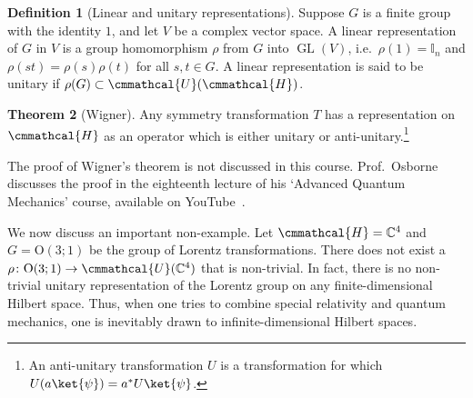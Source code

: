 \documentclass[a4 paper, 12pt]{book}
\renewcommand{\mathcal}{\cmmathcal}
\theoremstyle{definition}
\newtheorem{theorem}{Theorem}[section]
\newtheorem{definition}[theorem]{Definition}
\newcommand{\cc}{\mathbb{C}}
\newcommand{\ii}{\mathbb{I}}
\DeclareMathOperator{\GL}{GL}
\newcommand{\hilbert}{\mathcal{H}}
\newcommand{\unitary}{\mathcal{U}}
\newcommand{\ortho}{\mathrm{O}}
\newcommand{\lorentz}{\ortho{(3;1)}}
\begin{document}
	\begin{definition}[Linear and unitary representations]
		Suppose \(G\) is a finite group with the identity \(1\), and let \(V\) be a complex vector space. A linear representation of \(G\) in \(V\) is a group homomorphism \(\rho\) from \(G\) into \(\GL(V)\), i.e.\ \(\rho(1) = \ii_n\) and \(\rho(st) = \rho(s) \rho(t)\) for all \(s, t \in G\). A linear representation is said to be unitary if \(\rho(G) \subset \unitary(\hilbert)\).
	\end{definition}
	\begin{theorem}[Wigner]
		Any symmetry transformation \(T\) has a representation on \(\hilbert\) as an operator which is either unitary or anti-unitary.\footnote{An anti-unitary transformation \(U\) is a transformation for which \(U(a\ket{\psi}) = a^* U\ket{\psi}\).}
	\end{theorem}
	The proof of Wigner's theorem is not discussed in this course. Prof.\ Osborne discusses the proof in the eighteenth lecture of his `Advanced Quantum Mechanics' course, available on YouTube~\cite{Osborne_wigner}.

	We now discuss an important non-example. Let \(\hilbert = \cc^4\) and \(G = \lorentz\) be the group of Lorentz transformations. There does not exist a \(\rho \colon \lorentz \rightarrow \unitary(\cc^4)\) that is non-trivial. In fact, there is no non-trivial unitary representation of the Lorentz group on any finite-dimensional Hilbert space. Thus, when one tries to combine special relativity and quantum mechanics, one is inevitably drawn to infinite-dimensional Hilbert spaces.

	\nocite{*}
	\printbibliography[heading=bibintoc]
	\printindex
\end{document}
